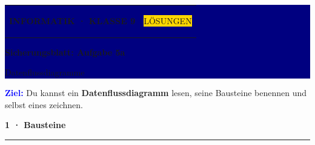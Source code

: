 \documentclass[11pt,a4paper]{article}
\newcommand{\sectiontitle}[2]{%
  \vspace{4mm}
  {\color{#1}\bfseries\large #2}\par
  \vspace{1.2mm}
  {\color{#1}\rule{\linewidth}{0.7pt}}\par
  \vspace{2mm}
}
\begin{document}
\colorbox{Navy}{%
  \parbox{\dimexpr\linewidth-2\fboxsep\relax}{%
    \vspace{3mm}
    \color{white}
    \begin{tabularx}{\linewidth}{@{}Xr@{}}
      {\small\bfseries INFORMATIK · KLASSE 9} &
      \colorbox{Gold}{\color{Navy}\small\bfseries\strut LÖSUNGEN}
    \end{tabularx}
    \vspace{2.5mm}

    {\fontsize{22}{25}\selectfont\bfseries Sicherungsblatt: Aufgabe 5a}\par
    \vspace{1mm}
    {\large Datenflussdiagramme}
    \vspace{3mm}
  }%
}

\vspace{4mm}
\colorbox{Sky}{%
  \parbox{\dimexpr\linewidth-2\fboxsep\relax}{%
    \vspace{2.4mm}
    \textcolor{Blue}{\bfseries Ziel:}
    Du kannst ein \textbf{Datenflussdiagramm} lesen, seine Bausteine benennen
    und selbst eines zeichnen.
    \vspace{2.4mm}
  }%
}

\sectiontitle{Blue}{1 · Bausteine}
\end{document}
